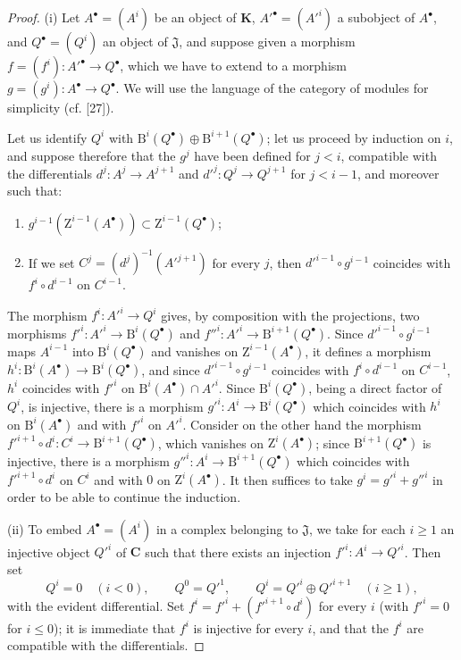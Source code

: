 \begin{proof}
\textup{(i)} Let $A^\bullet=(A^i)$ be an object of $\boldsymbol{K}$,
$A'^\bullet=(A'^i)$ a subobject of $A^\bullet$, and
$Q^\bullet=(Q^i)$ an object of $\mathfrak J$, and suppose given a morphism
$f=(f^i):A'^\bullet\to Q^\bullet$, which we have to extend to a morphism
$g=(g^i):A^\bullet\to Q^\bullet$. We will use the language of the category
of modules for simplicity (cf. [27]).

Let us identify $Q^i$ with
$\mathrm B^i(Q^\bullet)\oplus\mathrm B^{i+1}(Q^\bullet)$; let us proceed by
induction on $i$, and suppose therefore that the $g^j$ have been defined for $j<i$,
compatible with the differentials $d^j:A^j\to A^{j+1}$ and
$d'^j:Q^j\to Q^{j+1}$ for $j<i-1$, and moreover such that:
\begin{enumerate}
  \item[$1^\circ$] $g^{i-1}(\mathrm Z^{i-1}(A^\bullet))\subset
    \mathrm Z^{i-1}(Q^\bullet)$;
  \item[$2^\circ$] If we set $C^j=(d^j)^{-1}(A'^{j+1})$ for every $j$, then
    $d'^{i-1}\circ g^{i-1}$ coincides with $f^i\circ d^{i-1}$ on $C^{i-1}$.
\end{enumerate}
The morphism $f^i:A'^i\to Q^i$ gives, by composition with the projections,
two morphisms
$f'^i:A'^i\to\mathrm B^i(Q^\bullet)$ and
$f''^i:A'^i\to\mathrm B^{i+1}(Q^\bullet)$. Since
$d'^{i-1}\circ g^{i-1}$ maps $A^{i-1}$ into
$\mathrm B^i(Q^\bullet)$ and vanishes on $\mathrm Z^{i-1}(A^\bullet)$, it
defines a morphism
$h^i:\mathrm B^i(A^\bullet)\to\mathrm B^i(Q^\bullet)$, and since
$d'^{i-1}\circ g^{i-1}$ coincides with $f^i\circ d^{i-1}$ on $C^{i-1}$,
$h^i$ coincides with $f'^i$ on
$\mathrm B^i(A^\bullet)\cap A'^i$. Since $\mathrm B^i(Q^\bullet)$, being a direct
factor of $Q^i$, is injective, there is a morphism
$g'^i:A^i\to\mathrm B^i(Q^\bullet)$ which coincides with $h^i$ on
$\mathrm B^i(A^\bullet)$ and with $f'^i$ on $A'^i$. Consider on the other hand
the morphism
$f'^{i+1}\circ d^i:C^i\to\mathrm B^{i+1}(Q^\bullet)$, which vanishes on
$\mathrm Z^i(A^\bullet)$; since $\mathrm B^{i+1}(Q^\bullet)$ is injective,
there is a morphism $g''^i:A^i\to\mathrm B^{i+1}(Q^\bullet)$ which coincides
with $f'^{i+1}\circ d^i$ on $C^i$ and with $0$ on
$\mathrm Z^i(A^\bullet)$. It then suffices to take $g^i=g'^i+g''^i$ in order
to be able to continue the induction.

\textup{(ii)} To embed $A^\bullet=(A^i)$ in a complex belonging to
$\mathfrak J$, we take for each $i\geq1$ an injective object $Q'^i$ of
$\boldsymbol{C}$ such that there exists an injection $f'^i:A^i\to Q'^i$. Then
set
\[
  Q^i=0\quad(i<0),\qquad Q^0=Q'^1,\qquad
  Q^i=Q'^i\oplus Q'^{i+1}\quad(i\geq1),
\]
with the evident differential. Set
$f^i=f'^i+(f'^{i+1}\circ d^i)$ for every $i$ (with $f'^i=0$ for $i\leq0$);
it is immediate that $f^i$ is injective for every $i$, and that the $f^i$ are
compatible with the differentials.
\end{proof}

